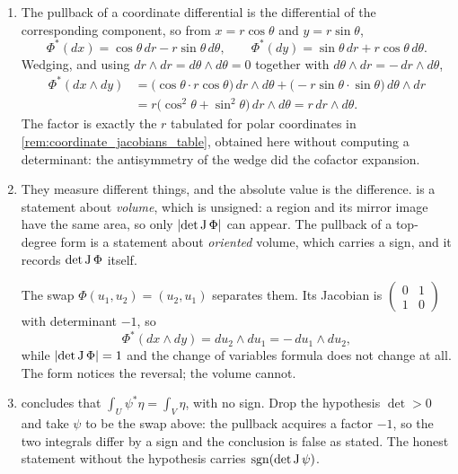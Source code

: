 
\begin{exercisesolution}
\label{sol:ai_pullback_area_form}
\begin{enumerate}[label=\textbf{(\alph*)}]
  \item The pullback of a coordinate differential is the differential of the corresponding
    component, so from $x = r\cos\theta$ and $y = r\sin\theta$,
    \[\Phi^*(dx) = \cos\theta\,dr - r\sin\theta\,d\theta,
      \qquad
      \Phi^*(dy) = \sin\theta\,dr + r\cos\theta\,d\theta.\]
    Wedging, and using $dr\wedge dr = d\theta\wedge d\theta = 0$ together with
    $d\theta\wedge dr = -\,dr\wedge d\theta$,
    \begin{align*}
      \Phi^*(dx\wedge dy)
        &= \big(\cos\theta\cdot r\cos\theta\big)\,dr\wedge d\theta
          + \big(-r\sin\theta\cdot\sin\theta\big)\,d\theta\wedge dr \\
        &= r\big(\cos^2\theta + \sin^2\theta\big)\,dr\wedge d\theta
         = r\,dr\wedge d\theta.
    \end{align*}
    The factor is exactly the $r$ tabulated for polar coordinates in
    \cref{rem:coordinate_jacobians_table}, obtained here without computing a determinant: the
    antisymmetry of the wedge did the cofactor expansion.
  \item They measure different things, and the absolute value is the difference.
     is a statement about \emph{volume}, which is unsigned: a
    region and its mirror image have the same area, so only $\lvert\det\operatorname{J}\Phi\rvert$ can
    appear. The pullback of a top-degree form is a statement about \emph{oriented} volume, which
    carries a sign, and it records $\det\operatorname{J}\Phi$ itself.

    The swap $\Phi(u_1,u_2) = (u_2,u_1)$ separates them. Its Jacobian is
    $\left(\begin{smallmatrix}0&1\\1&0\end{smallmatrix}\right)$ with determinant $-1$, so
    \[\Phi^*(dx\wedge dy) = du_2\wedge du_1 = -\,du_1\wedge du_2,\]
    while $\lvert\det\operatorname{J}\Phi\rvert = 1$ and the change of variables formula does not change at
    all. The form notices the reversal; the volume cannot.
  \item {} concludes that $\int_U\psi^*\eta = \int_V\eta$, with no sign. Drop
    the hypothesis $\det > 0$ and take $\psi$ to be the swap above: the pullback acquires a
    factor $-1$, so the two integrals differ by a sign and the conclusion is false as stated. The
    honest statement without the hypothesis carries $\operatorname{sgn}(\det\operatorname{J}\psi)$.


\end{enumerate}
\end{exercisesolution}
